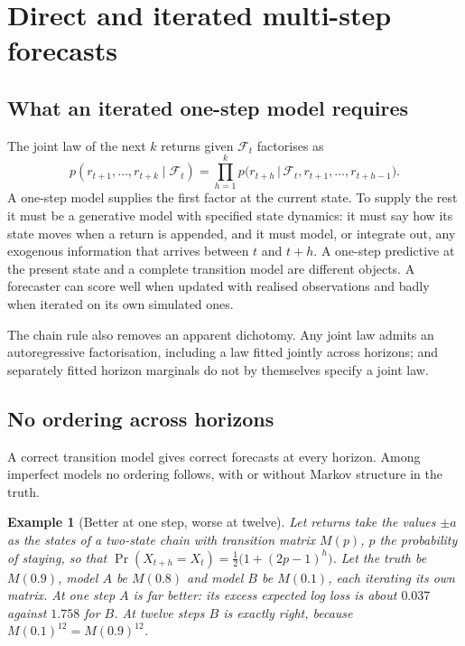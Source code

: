 \documentclass[11pt]{article}
\newtheorem{example}{Example}
\newcommand{\F}{\mathcal{F}}
\begin{document}
\section{Direct and iterated multi-step forecasts}

\subsection{What an iterated one-step model requires}

The joint law of the next $k$ returns given $\F_t$ factorises as
\[
p(r_{t+1}, \dots, r_{t+k} \mid \F_t) = \prod_{h=1}^{k} p\big(r_{t+h} \,\big|\, \F_t, r_{t+1}, \dots, r_{t+h-1}\big).
\]
A one-step model supplies the first factor at the current state. To supply the rest it must be a generative model with specified state dynamics: it must say how its state moves when a return is appended, and it must model, or integrate out, any exogenous information that arrives between $t$ and $t+h$. A one-step predictive at the present state and a complete transition model are different objects. A forecaster can score well when updated with realised observations and badly when iterated on its own simulated ones.

The chain rule also removes an apparent dichotomy. Any joint law admits an autoregressive factorisation, including a law fitted jointly across horizons; and separately fitted horizon marginals do not by themselves specify a joint law.

\subsection{No ordering across horizons}

A correct transition model gives correct forecasts at every horizon. Among imperfect models no ordering follows, with or without Markov structure in the truth.

\begin{example}[Better at one step, worse at twelve]
Let returns take the values $\pm a$ as the states of a two-state chain with transition matrix $M(p)$, $p$ the probability of staying, so that $\Pr(X_{t+h} = X_t) = \tfrac{1}{2}\big(1 + (2p-1)^h\big)$. Let the truth be $M(0.9)$, model $A$ be $M(0.8)$ and model $B$ be $M(0.1)$, each iterating its own matrix. At one step $A$ is far better: its excess expected log loss is about $0.037$ against $1.758$ for $B$. At twelve steps $B$ is exactly right, because $M(0.1)^{12} = M(0.9)^{12}$.
\end{example}
\end{document}
